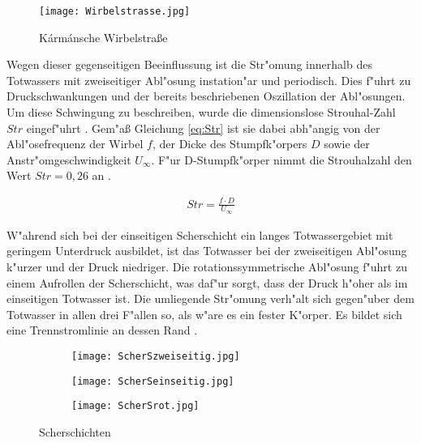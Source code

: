 \begin{figure}[h]
	\centering
	\texttt{[image: Wirbelstrasse.jpg]}
	\caption{K\'arm\'ansche Wirbelstra\ss{}e \cite{Hucho.2011}}
	\label{fig:Wirbelstrasse}
\end{figure}


Wegen dieser gegenseitigen Beeinflussung ist die Str"omung innerhalb des Totwassers mit zweiseitiger Abl"osung instation"ar und periodisch. Dies f"uhrt zu Druckschwankungen und der bereits beschriebenen Oszillation der Abl"osungen. Um diese Schwingung zu beschreiben, wurde die dimensionslose Strouhal-Zahl $Str$ eingef"uhrt \cite{Leder.1992}. Gem"a\ss{} Gleichung \ref{eq:Str} ist sie dabei abh"angig von der Abl"osefrequenz der Wirbel $f$, der Dicke des Stumpfk"orpers $D$ sowie der Anstr"omgeschwindigkeit $U_{\infty}$. F"ur D-Stumpfk"orper nimmt die Strouhalzahl den Wert $Str = 0,26$ an \cite{Pastoor.2008}.

\begin{align}
	{Str}=\frac{f \cdot D}{U_{\infty}}	
	\label{eq:Str}
\end{align}


W"ahrend sich bei der einseitigen Scherschicht ein langes Totwassergebiet mit geringem Unterdruck ausbildet, ist das Totwasser bei der zweiseitigen Abl"osung k"urzer und der Druck niedriger. Die rotationssymmetrische Abl"osung f"uhrt zu einem Aufrollen der Scherschicht, was daf"ur sorgt, dass der Druck h"oher als im einseitigen Totwasser ist. Die umliegende Str"omung verh"alt sich gegen"uber dem Totwasser in allen drei F"allen so, als w"are es  ein fester K"orper. Es bildet sich eine Trennstromlinie an dessen Rand \cite{Hucho.2011}. 

\begin{figure}[h]
	\centering
	\begin{subfigure}[c]{0.35\textwidth}
		\texttt{[image: ScherSzweiseitig.jpg]}
		\label{fig:Scherungzweiseitig}
	\end{subfigure}
	\begin{subfigure}[c]{0.35\textwidth}		
		\texttt{[image: ScherSeinseitig.jpg]}
		\label{fig:Scherungeinseitig}
	\end{subfigure}
	\begin{subfigure}[c]{0.35\textwidth}
		\texttt{[image: ScherSrot.jpg]}
		\label{fig:Scherungrotatorisch}
	\end{subfigure}
	\caption{ Scherschichten \cite{Hucho.2011}}
	\label{fig:Scherschichten}
\end{figure}
 

